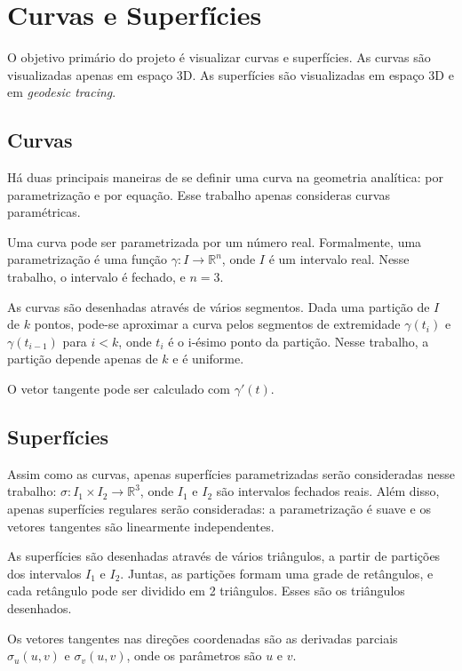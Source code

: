 \chapter{Curvas e Superfícies}
\label{geomdiff}
O objetivo primário do projeto é visualizar curvas e superfícies.
As curvas são visualizadas apenas em espaço 3D.
As superfícies são visualizadas em espaço 3D e em \textit{geodesic tracing}.

\section{Curvas}
Há duas principais maneiras de se definir uma curva na geometria analítica:
por parametrização e por equação. Esse trabalho apenas consideras curvas paramétricas.

Uma curva pode ser parametrizada por um número real.
Formalmente, uma parametrização é uma função $\gamma : I \rightarrow \mathbb{R}^n$, onde $I$ é um intervalo real.
Nesse trabalho, o intervalo é fechado, e $n=3$.

As curvas são desenhadas através de vários segmentos.
Dada uma partição de $I$ de $k$ pontos,
pode-se aproximar a curva pelos segmentos de extremidade $\gamma(t_{i})$ e $\gamma(t_{i-1})$ para $i<k$,
onde $t_i$ é o i-ésimo ponto da partição. Nesse trabalho, a partição depende apenas de $k$ e é uniforme.

O vetor tangente pode ser calculado com $\gamma'(t)$.

\section{Superfícies}
Assim como as curvas, apenas superfícies parametrizadas serão consideradas nesse trabalho:
$\sigma :  I_1 \times I_2 \rightarrow \mathbb{R}^3$, onde $I_1$ e $I_2$ são intervalos fechados reais.
Além disso, apenas superfícies regulares serão consideradas: a parametrização é suave e
os vetores tangentes são linearmente independentes.

As superfícies são desenhadas através de vários triângulos,
a partir de partições dos intervalos $I_1$ e $I_2$.
Juntas, as partições formam uma grade de retângulos, e cada retângulo pode ser dividido em 2 triângulos.
Esses são os triângulos desenhados.

Os vetores tangentes nas direções coordenadas são as derivadas parciais $\sigma_u(u,v)$ e $\sigma_v(u,v)$, onde os parâmetros são $u$ e $v$.

